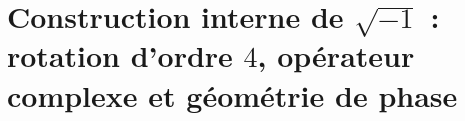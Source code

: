 \chapter{Construction interne de \(\sqrt{-1}\) : rotation d’ordre \(4\), opérateur complexe et géométrie de phase}
\label{chap:p3-final:32:raiz_menos_uno}

